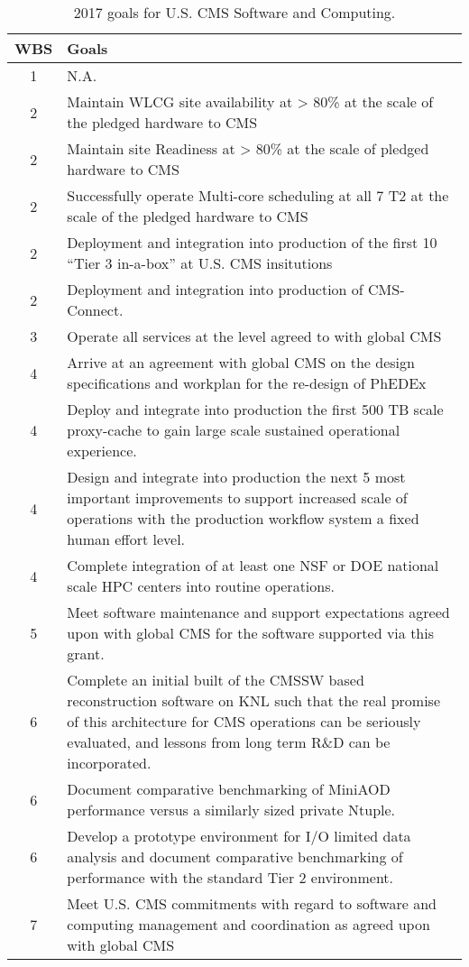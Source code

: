 \documentclass[11pt,a4paper]{article}
\begin{document}
\begin{table}
\begin{center}
\begin{tabular}{|c|l|}
\hline
WBS & Goals \\\hline
1 & N.A. \\
2 & Maintain WLCG site availability at > 80\% at the scale of the pledged hardware to CMS\\
2 & Maintain site Readiness at > 80\% at the scale of pledged hardware to CMS\\
2 & Successfully operate Multi-core scheduling at all 7 T2 at the scale of the pledged hardware to CMS\\
2 & Deployment and integration into production of the first 10 ``Tier 3 in-a-box'' at U.S. CMS insitutions\\
2 & Deployment and integration into production of CMS-Connect.\\
3 & Operate all services at the level agreed to with global CMS\\
4 & Arrive at an agreement with global CMS on the design specifications and workplan for the re-design of PhEDEx\\
4 & Deploy and integrate into production the first 500 TB scale proxy-cache to gain large scale sustained operational experience.\\
4 & Design and integrate into production the next 5 most important improvements to support increased scale of operations with the production workflow
       system a fixed human effort level.\\
4 & Complete integration of at least one NSF or DOE national scale HPC centers into routine operations.\\ 
5 & Meet software maintenance and support expectations agreed upon with global CMS for the software supported via this grant.\\
6 & Complete an initial built of the CMSSW based reconstruction software on KNL such that the real promise of this architecture for CMS operations
        can be seriously evaluated, and lessons from long term R\&D can be incorporated.\\
6 & Document comparative benchmarking of MiniAOD performance versus a similarly sized private Ntuple.\\
6 & Develop a prototype environment for I/O limited data analysis and document comparative benchmarking of performance with the standard Tier 2 environment.\\
7 & Meet U.S. CMS commitments with regard to software and computing management and coordination as agreed upon with global CMS\\\hline
\end{tabular}
\caption[]
{
2017 goals for U.S. CMS Software and Computing.
}
\label{scgoals}
\end{center}
\end{table}
\end{document}
